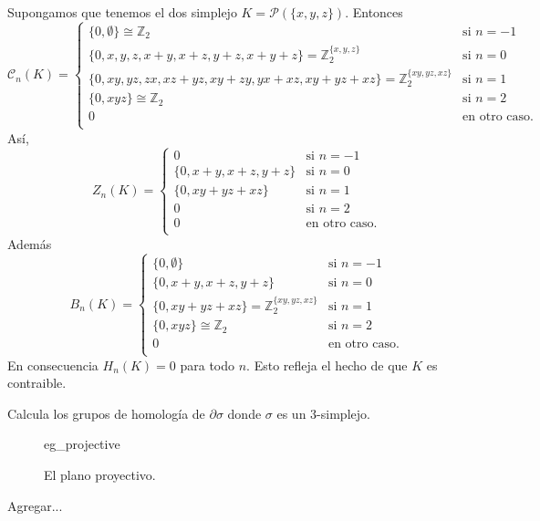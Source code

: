 \documentclass{standalone}
\begin{document}
	\begin{example}
		Supongamos que tenemos el dos simplejo $K=\mathcal{P}(\{x,y,z\})$. Entonces
		\begin{equation}
			\mathcal{C}_{n}(K)=
			\begin{cases}
				\{0,\emptyset\}\cong\mathbb{Z}_{2} &\text{si }n=-1\\
				\{0,x,y,z,x+y,x+z,y+z,x+y+z\}=\mathbb{Z}_{2}^{\{x,y,z\}} &\text{si }n=0\\
				\{0,xy,yz,zx,xz+yz,xy+zy,yx+xz,xy+yz+xz\}=\mathbb{Z}_{2}^{\{xy,yz,xz\}} &\text{si }n=1\\
				\{0,xyz\}\cong\mathbb{Z}_{2} &\text{si }n=2\\
				0 &\text{en otro caso.}\\
			\end{cases}
		\end{equation}
		Así, 
		\begin{equation}
			Z_{n}(K)=
			\begin{cases}
				0 &\text{si }n=-1\\
				\{0,x+y,x+z,y+z\} &\text{si }n=0\\
				\{0,xy+yz+xz\} &\text{si }n=1\\
				0 &\text{si }n=2\\
				0 &\text{en otro caso.}\\
			\end{cases}
		\end{equation}
		Además 
		\begin{equation}
			B_{n}(K)=
			\begin{cases}
				\{0,\emptyset\} &\text{si }n=-1\\
				\{0,x+y,x+z,y+z\} &\text{si }n=0\\
				\{0,xy+yz+xz\}=\mathbb{Z}_{2}^{\{xy,yz,xz\}} &\text{si }n=1\\
				\{0,xyz\}\cong\mathbb{Z}_{2} &\text{si }n=2\\
				0 &\text{en otro caso.}\\
			\end{cases}
		\end{equation}
		En consecuencia $H_{n}(K)=0$ para todo $n$. Esto refleja el hecho de que $K$ es contraible.
	\end{example}
	
	\begin{exercise}
		Calcula los grupos de homología de $\partial\sigma$ donde $\sigma$ es un $3$-simplejo.
	\end{exercise}
	
	\begin{figure}[h]
		\centering
		{eg_projective}
		\caption{El plano proyectivo.}
		\label{fig:projective}
	\end{figure}
	
	\begin{example}
		Agregar...
	\end{example}
\end{document}
